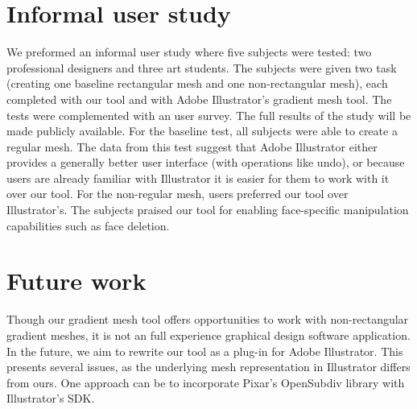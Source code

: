 \documentclass{egpubl}
\newcommand{\note}[3]{{\color{#2}\textbf{#1: #3}}}
\newcommand{\john}[1]{\note{JohnKa}{RubineRed}{#1}}
\begin{document}
	\section{Informal user study}
	\label{sec:results}
	
	
	
	We preformed an informal user study where five subjects were tested: two professional designers and three art students. The subjects were given two task (creating one baseline rectangular mesh and one non-rectangular mesh), each completed with our tool and with Adobe Illustrator's gradient mesh tool. The tests were complemented with an user survey. The full results of the study will be made publicly available. For the baseline test, all subjects were able to create a regular mesh. The data from this test suggest that Adobe Illustrator either provides a generally better user interface (with operations like undo), or because users are already familiar with Illustrator it is easier for them to work with it over our tool. For the non-regular mesh, users preferred our tool over Illustrator's. The subjects praised our tool for enabling face-specific manipulation capabilities such as face deletion.
	
	\section{Future work}
	\label{sec:FW}
	
	Though our gradient mesh tool offers opportunities to work with non-rectangular gradient meshes, it is not an full experience graphical design software application. In the future, we aim to rewrite our tool as a plug-in for Adobe Illustrator. This presents several issues, as the underlying mesh representation in Illustrator differs from ours. One approach can be to incorporate Pixar's OpenSubdiv library with Illustrator's SDK.
	
	
	
	
	
\end{document}
